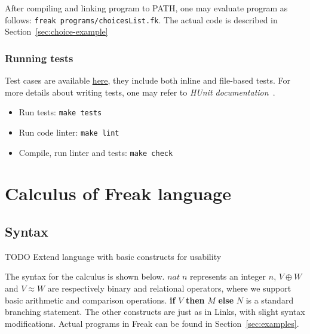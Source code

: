 \documentclass[declaration,shortabstract]{iithesis}
\theoremstyle{definition} \newtheorem{definition}{Definition}[chapter]
\theoremstyle{remark} \newtheorem{remark}[definition]{Observation}
\theoremstyle{plain} \newtheorem{theorem}[definition]{Theorem}
\theoremstyle{plain} \newtheorem{lemma}[definition]{Lemma}
\begin{document}
    After compiling and linking program to PATH, one may evaluate program as
    follows: \verb!freak programs/choicesList.fk!. The actual code is described in Section~\ref{sec:choice-example}

    \subsection{Running tests}

    Test cases are available \href{https://github.com/Tomatosoup97/freak/blob/master/src/Tests.hs}{\underline{here}},
    they include both inline and file-based tests. For more details about
    writing tests, one may refer to \textit{HUnit documentation}~\cite{hunit-docs}.

    \begin{itemize}
        \item Run tests: \verb!make tests!
        \item Run code linter: \verb!make lint!
        \item Compile, run linter and tests: \verb!make check!
    \end{itemize}

\chapter{Calculus of Freak language}
\section{Syntax}

    TODO Extend language with basic constructs for usability

    The syntax for the calculus is shown below. $nat \; n$ represents an integer $n$,
    $V \oplus W$ and $V \approx W$ are respectively binary and relational operators,
    where we support basic arithmetic and comparison operations.
    \textbf{if} $V$ \textbf{then} $M$ \textbf{else} $N$ is a standard branching
    statement. The other constructs are just as in Links, with slight syntax
    modifications. Actual programs in Freak can be found in Section~\ref{sec:examples}.
\end{document}
